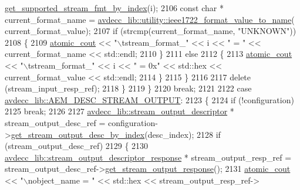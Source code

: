 \begin{DoxyCode}
      \hyperlink{classavdecc__lib_1_1stream__input__descriptor__response_a4e92ab02c01dc1343a66d43403e470a3}{get\_supported\_stream\_fmt\_by\_index}(i);
2106                 \textcolor{keyword}{const} \textcolor{keywordtype}{char} * current\_format\_name = 
      \hyperlink{namespaceavdecc__lib_1_1utility_a65f055a50d3d236b67d30c1a7b8425c8}{avdecc\_lib::utility::ieee1722\_format\_value\_to\_name}(
      current\_format\_value);
2107                 \textcolor{keywordflow}{if} (strcmp(current\_format\_name, \textcolor{stringliteral}{"UNKNOWN"}))
2108                 \{
2109                     \hyperlink{cmd__line_8h_a0bc38ccc65c79ba06c6fcd7b4bf554c3}{atomic\_cout} << \textcolor{stringliteral}{"\(\backslash\)tstream\_format\_"} << i << \textcolor{stringliteral}{" = "} << current\_format\_name << 
      std::endl;
2110                 \}
2111                 \textcolor{keywordflow}{else}
2112                 \{
2113                     \hyperlink{cmd__line_8h_a0bc38ccc65c79ba06c6fcd7b4bf554c3}{atomic\_cout} << \textcolor{stringliteral}{"\(\backslash\)tstream\_format\_"} << i << \textcolor{stringliteral}{" = 0x"} << std::hex << 
      current\_format\_value << std::endl;
2114                 \}
2115             \}
2116 
2117             \textcolor{keyword}{delete} (stream\_input\_resp\_ref);
2118         \}
2119     \}
2120     \textcolor{keywordflow}{break};
2121 
2122     \textcolor{keywordflow}{case} \hyperlink{namespaceavdecc__lib_ac7b7d227e46bc72b63ee9e9aae15902fa3e5e9421e49598854000feaa2fe71464}{avdecc\_lib::AEM\_DESC\_STREAM\_OUTPUT}:
2123     \{
2124         \textcolor{keywordflow}{if} (!configuration)
2125             \textcolor{keywordflow}{break};
2126 
2127         \hyperlink{classavdecc__lib_1_1stream__output__descriptor}{avdecc\_lib::stream\_output\_descriptor} * stream\_output\_desc\_ref =
       configuration->\hyperlink{classavdecc__lib_1_1configuration__descriptor_a300ea5957342e2e9579318135da02856}{get\_stream\_output\_desc\_by\_index}(desc\_index);
2128         \textcolor{keywordflow}{if} (stream\_output\_desc\_ref)
2129         \{
2130             \hyperlink{classavdecc__lib_1_1stream__output__descriptor__response}{avdecc\_lib::stream\_output\_descriptor\_response} * 
      stream\_output\_resp\_ref = stream\_output\_desc\_ref->\hyperlink{classavdecc__lib_1_1stream__output__descriptor_af92b70610c451a7f1eefcb71b3d97eb8}{get\_stream\_output\_response}();
2131             \hyperlink{cmd__line_8h_a0bc38ccc65c79ba06c6fcd7b4bf554c3}{atomic\_cout} << \textcolor{stringliteral}{"\(\backslash\)nobject\_name = "} << std::hex << stream\_output\_resp\_ref->

\end{DoxyCode}
